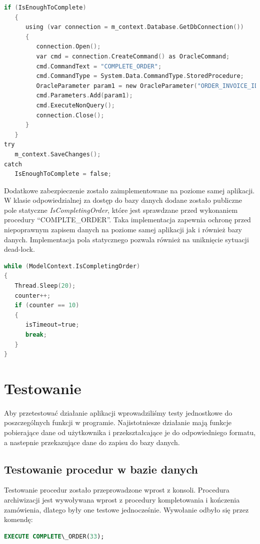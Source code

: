 \documentclass{article}
\begin{document}
\begin{lstlisting}[language=C, frame=single,tabsize=1,caption={Kod aplikacji wywołujący procedurę COMPLETE\_ORDER}]
if (IsEnoughToComplete)
   {
      using (var connection = m_context.Database.GetDbConnection())
      {
         connection.Open();
         var cmd = connection.CreateCommand() as OracleCommand;
         cmd.CommandText = "COMPLETE_ORDER";
         cmd.CommandType = System.Data.CommandType.StoredProcedure;
         OracleParameter param1 = new OracleParameter("ORDER_INVOICE_ID", InvoiceID);
         cmd.Parameters.Add(param1);
         cmd.ExecuteNonQuery();
         connection.Close();
      }
   }
try
   m_context.SaveChanges();
catch
   IsEnoughToComplete = false;
\end{lstlisting}

Dodatkowe zabezpieczenie zostało zaimplementowane na poziome samej aplikacji. W
klasie odpowiedzialnej za dostęp do bazy danych dodane zostało publiczne pole
statyczne \textit{IsCompletingOrder}, które jest sprawdzane przed wykonaniem
procedury ``COMPLTE\_ORDER''. Taka implementacja zapewnia ochronę przed
niepoprawnym zapisem danych na poziome samej aplikacji jak i również bazy
danych. Implementacja pola statycznego pozwala również na uniknięcie sytuacji
dead-lock.
\begin{lstlisting}[language=C,frame=single]
while (ModelContext.IsCompletingOrder)
{
   Thread.Sleep(20);
   counter++;
   if (counter == 10)
   {
      isTimeout=true;
      break;
   }
}
\end{lstlisting}

\section{Testowanie}
\paragraph{}
Aby przetestować działanie aplikacji wprowadziliśmy testy jednostkowe do poszczególnych funkcji w
programie.
Najistotniesze działanie mają funkcje pobierające dane od użytkownika i przekształcające je do
odpowiedniego formatu, a nastepnie przekazujące dane do zapisu do bazy danych.

\subsection{Testowanie procedur w bazie danych}
Testowanie procedur zostało przeprowadzone wprost z konsoli. Procedura
archiwizacji jest wywoływana wprost z procedury kompletowania i kończenia
zamówienia, dlatego były one testowe jednocześnie. Wywołanie odbyło się przez
komendę:
\begin{lstlisting}[language=sql]
   EXECUTE COMPLETE\_ORDER(33);
\end{lstlisting}
\end{document}
